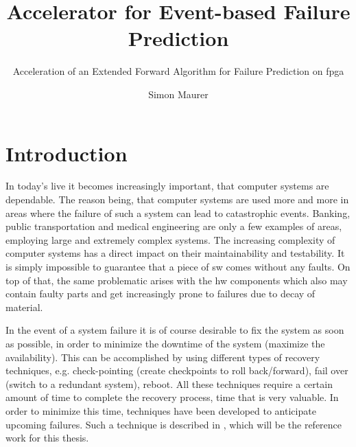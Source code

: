 \documentclass[mscthesis]{usiinfthesis}
\title{Accelerator for Event-based Failure Prediction} %
\subtitle{Acceleration of an Extended Forward Algorithm for Failure Prediction
    on \acrshort{fpga}}
\author{Simon Maurer} %
\begin{document}
\maketitle %

\frontmatter %

\begin{abstract}
\end{abstract}

%

\begin{acknowledgements}
\end{acknowledgements}

\tableofcontents 
\listoffigures %
\listoftables %
\lstlistoflistings

\mainmatter

\chapter{Introduction}
\label{ch:intro}
\glsresetall %

In today's live it becomes increasingly important, that computer systems are
dependable. The reason being, that computer systems are used more and more in
areas where the failure of such a system can lead to catastrophic events.
Banking, public transportation and medical engineering are only a few examples
of areas, employing large and extremely complex systems. The increasing
complexity of computer systems has a direct impact on their maintainability and
testability. It is simply impossible to guarantee that a piece of \gls{sw}
comes without any faults. On top of that, the same problematic arises with the
\gls{hw} components which also may contain faulty parts and get increasingly
prone to failures due to decay of material.

In the event of a system failure it is of course desirable to fix the system as
soon as possible, in order to minimize the downtime of the system (maximize the
availability). This can be accomplished by using different types of recovery
techniques, e.g. check-pointing (create checkpoints to roll back/forward), fail
over (switch to a redundant system), reboot. All these techniques require
a certain amount of time to complete the recovery process, time that is very
valuable. In order to minimize this time, techniques have been developed to
anticipate upcoming failures. Such a technique is described in
\cite{salfner08}, which will be the reference work for this thesis.
\end{document}
